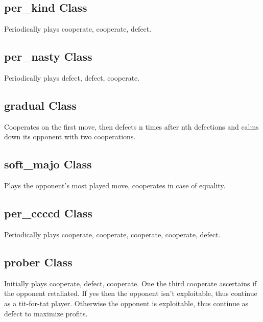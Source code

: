 \documentclass[12pt]{article}
\begin{document}
\subsection{per\_kind Class}
Periodically plays cooperate, cooperate, defect.
\subsection{per\_nasty Class}
Periodically plays defect, defect, cooperate.
\subsection{gradual Class}
Cooperates on the first move, then defects n times after nth defections
and calms down its opponent with two cooperations.
\subsection{soft\_majo Class}
Plays the opponent's most played move, cooperates in case of equality.
\subsection{per\_ccccd Class}
Periodically plays cooperate, cooperate, cooperate, cooperate, defect.
\subsection{prober Class}
Initially plays cooperate, defect, cooperate. One the third cooperate ascertains if the opponent retaliated. If yes then the opponent isn't exploitable, thus continue as a tit-for-tat player. Otherwise the opponent is exploitable, thus continue as defect to maximize profits.
\end{document}
